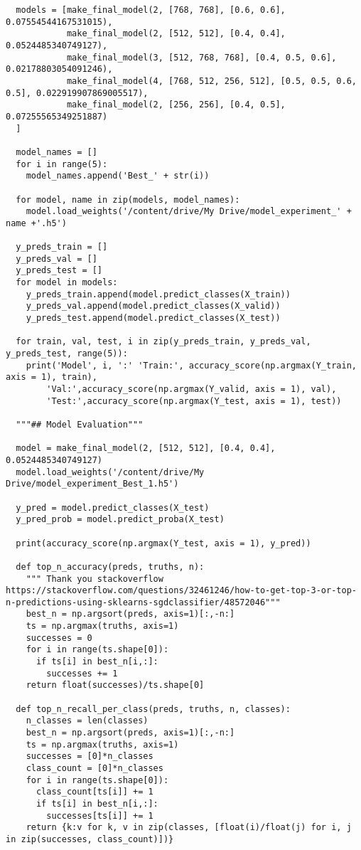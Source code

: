 \documentclass[12pt]{article}
\numberwithin{equation}{section}
\numberwithin{figure}{section}
\numberwithin{table}{section}
\begin{document}
\begin{lstlisting}
  models = [make_final_model(2, [768, 768], [0.6, 0.6], 0.07554544167531015),
            make_final_model(2, [512, 512], [0.4, 0.4], 0.0524485340749127),
            make_final_model(3, [512, 768, 768], [0.4, 0.5, 0.6], 0.02178803054091246),
            make_final_model(4, [768, 512, 256, 512], [0.5, 0.5, 0.6, 0.5], 0.022919907869005517),
            make_final_model(2, [256, 256], [0.4, 0.5], 0.07255565349251887)
  ]
  
  model_names = []
  for i in range(5):
    model_names.append('Best_' + str(i))
  
  for model, name in zip(models, model_names):
    model.load_weights('/content/drive/My Drive/model_experiment_' + name +'.h5')
  
  y_preds_train = []
  y_preds_val = []
  y_preds_test = []
  for model in models:
    y_preds_train.append(model.predict_classes(X_train))
    y_preds_val.append(model.predict_classes(X_valid))
    y_preds_test.append(model.predict_classes(X_test))
  
  for train, val, test, i in zip(y_preds_train, y_preds_val,  y_preds_test, range(5)):
    print('Model', i, ':' 'Train:', accuracy_score(np.argmax(Y_train, axis = 1), train),
        'Val:',accuracy_score(np.argmax(Y_valid, axis = 1), val), 
        'Test:',accuracy_score(np.argmax(Y_test, axis = 1), test))
  
  """## Model Evaluation"""
  
  model = make_final_model(2, [512, 512], [0.4, 0.4], 0.0524485340749127)
  model.load_weights('/content/drive/My Drive/model_experiment_Best_1.h5')
  
  y_pred = model.predict_classes(X_test)
  y_pred_prob = model.predict_proba(X_test)
  
  print(accuracy_score(np.argmax(Y_test, axis = 1), y_pred))
  
  def top_n_accuracy(preds, truths, n):
    """ Thank you stackoverflow https://stackoverflow.com/questions/32461246/how-to-get-top-3-or-top-n-predictions-using-sklearns-sgdclassifier/48572046"""
    best_n = np.argsort(preds, axis=1)[:,-n:]
    ts = np.argmax(truths, axis=1)
    successes = 0
    for i in range(ts.shape[0]):
      if ts[i] in best_n[i,:]:
        successes += 1
    return float(successes)/ts.shape[0]
  
  def top_n_recall_per_class(preds, truths, n, classes):
    n_classes = len(classes)
    best_n = np.argsort(preds, axis=1)[:,-n:]
    ts = np.argmax(truths, axis=1)
    successes = [0]*n_classes
    class_count = [0]*n_classes
    for i in range(ts.shape[0]):
      class_count[ts[i]] += 1
      if ts[i] in best_n[i,:]:
        successes[ts[i]] += 1
    return {k:v for k, v in zip(classes, [float(i)/float(j) for i, j in zip(successes, class_count)])}
  

\end{lstlisting}
\end{document}
